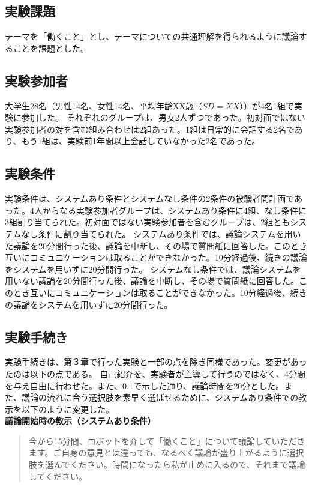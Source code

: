 \documentclass[11pt, a4paper]{jreport} %
\begin{document}
\subsection{実験課題}
\label{sec:jikkenkadai2}
テーマを「働くこと」とし、テーマについての共通理解を得られるように議論することを課題とした。

\subsection{実験参加者}
大学生28名（男性14名、女性14名、平均年齢XX歳（$SD=XX$））が4名1組で実験に参加した。
それぞれのグループは、男女2人ずつであった。初対面ではない実験参加者の対を含む組み合わせは2組あった。1組は日常的に会話する2名であり、もう1組は、実験前1年間以上会話していなかった2名であった。

\subsection{実験条件}
実験条件は、システムあり条件とシステムなし条件の2条件の被験者間計画であった。4人からなる実験参加者グループは、システムあり条件に4組、なし条件に3組割り当てられた。初対面ではない実験参加者を含むグループは、2組ともシステムなし条件に割り当てられた。
システムあり条件では、議論システムを用いた議論を20分間行った後、議論を中断し、その場で質問紙に回答した。このとき互いにコミュニケーションは取ることができなかった。10分経過後、続きの議論をシステムを用いずに20分間行った。
システムなし条件では、議論システムを用いない議論を20分間行った後、議論を中断し、その場で質問紙に回答した。このとき互いにコミュニケーションは取ることができなかった。10分経過後、続きの議論をシステムを用いずに20分間行った。

\subsection{実験手続き}
実験手続きは、第３章で行った実験と一部の点を除き同様であった。変更があったのは以下の点である。
自己紹介を、実験者が主導して行うのではなく、4分間を与え自由に行わせた。また、\ref{sec:jikkenkadai2}で示した通り、議論時間を20分とした。また、議論の流れに合う選択肢を素早く選ばせるために、システムあり条件での教示を以下のように変更した。\\
\textbf{議論開始時の教示（システムあり条件）}
\begin{quote}
今から15分間、ロボットを介して「働くこと」について議論していただきます。ご自身の意見とは違っても、なるべく議論が盛り上がるように選択肢を選んでください。時間になったら私が止めに入るので、それまで議論してください。
\end{quote}
\end{document}
